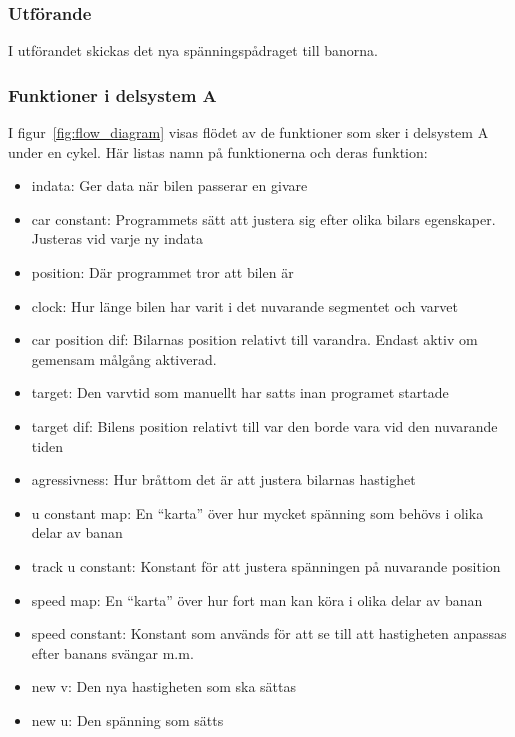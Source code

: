     \subsubsection{Utförande}

    	I utförandet skickas det nya spänningspådraget till banorna. 
	

    \subsubsection{Funktioner i delsystem A}
	I figur~\ref{fig:flow_diagram}  visas flödet av de funktioner som sker i delsystem A under en cykel.
	Här listas namn på funktionerna och deras funktion:
	\begin{itemize}
 		\item indata: Ger data när bilen passerar en givare
		\item car constant: Programmets sätt att justera sig efter olika bilars egenskaper. Justeras vid varje ny indata
 		\item position: Där programmet tror att bilen är
 		\item clock: Hur länge bilen har varit i det nuvarande segmentet och varvet
		\item car position dif: Bilarnas position relativt till varandra. Endast aktiv om gemensam målgång aktiverad.
		\item target: Den varvtid som manuellt har satts inan programet startade
		\item target dif: Bilens position relativt till var den borde vara vid den nuvarande tiden
		\item agressivness: Hur bråttom det är att justera bilarnas hastighet 
		\item u constant map: En ``karta'' över hur mycket spänning som behövs i olika delar av banan
		\item track u constant: Konstant för att justera spänningen på nuvarande position
		\item speed map: En ``karta'' över hur fort man kan köra i olika delar av banan		
		\item speed constant: Konstant som används för att se till att hastigheten anpassas efter banans svängar m.m.
		\item new v: Den nya hastigheten som ska sättas
		\item new u: Den spänning som sätts
	\end{itemize}

